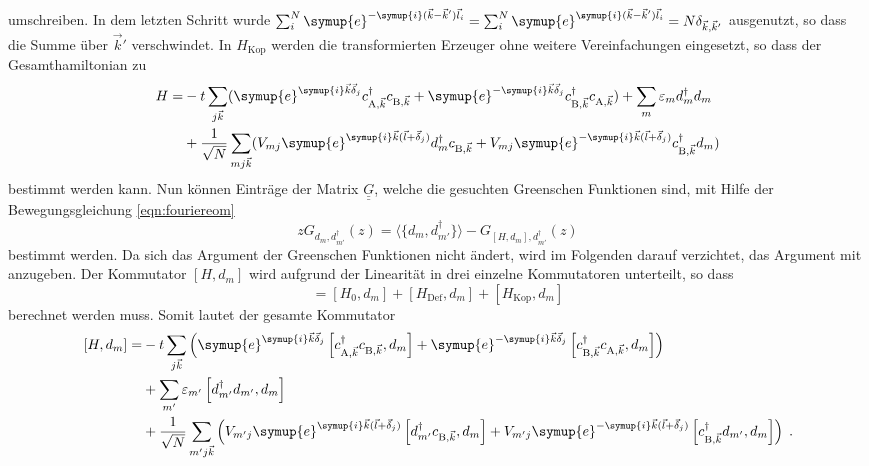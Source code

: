 umschreiben.
In dem letzten Schritt wurde $\sum_{i}^N \symup{e}^{-\symup{i}(\vec{k}- \vec{k}')\vec{l}_i} 
= \sum_{i}^N \symup{e}^{\symup{i}(\vec{k}- \vec{k}')\vec{l}_i} = N\delta_{\vec{k}, \vec{k}'}$ ausgenutzt, so dass die Summe über $\vec{k}'$ verschwindet.
In $H_\text{Kop}$ werden die transformierten Erzeuger ohne weitere Vereinfachungen eingesetzt,  so dass der Gesamthamiltonian zu 
\begin{equation*}
    \begin{split}
        H = &-t \sum_{j \vec{k}} ( \symup{e}^{\symup{i}\vec{k}\vec{\delta}_j}c^\dagger_{\text{A},\vec{k}} c_{\text{B},\vec{k}} + 
            \symup{e}^{-\symup{i}\vec{k}\vec{\delta}_j} c^\dagger_{\text{B},\vec{k}}c_{\text{A},\vec{k}}) + \sum_m \varepsilon_m d_m^\dagger d_m \\
            &+ \frac{1}{\sqrt{N}}\sum_{mj\vec{k}} ( V_{mj}  \symup{e}^{\symup{i}\vec{k}(\vec{l}+\vec{\delta}_j)} d_m^\dagger c_{\text{B},\vec{k}} 
            + V_{mj} \symup{e}^{-\symup{i}\vec{k}(\vec{l}+\vec{\delta}_j)}c^\dagger_{\text{B},\vec{k}} d_m )
    \end{split}
\end{equation*}
bestimmt werden kann.
Nun können Einträge der Matrix $\underline{\underline{G}}$, welche die gesuchten Greenschen Funktionen sind, mit Hilfe der Bewegungsgleichung \eqref{eqn:fouriereom} 
\begin{equation}
    zG_{d_m, d_{m'}^\dagger}(z) = \langle \{ d_m, d_{m'}^\dagger \} \rangle - G_{[H,d_m], d_{m'}^\dagger} (z) \label{eqn:eomgreenansatz}
\end{equation}
bestimmt werden.
Da sich das Argument der Greenschen Funktionen nicht ändert, wird im Folgenden darauf verzichtet, das Argument mit anzugeben.
Der Kommutator $[H,d_m]$ wird aufgrund der Linearität in drei einzelne Kommutatoren unterteilt, so dass
\begin{equation*}
    [H,d_m] = [H_0,d_m] + [H_\text{Def},d_m] +[H_\text{Kop},d_m] 
\end{equation*}
berechnet werden muss.
Somit lautet der gesamte Kommutator
\begin{equation}
    \begin{split}
    [H, d_m] = &-t \sum_{j\vec{k}} \left ( \symup{e}^{\symup{i}\vec{k} \vec{\delta}_j}      \left [ c^\dagger_{\text{A},\vec{k}}  
        c_{\text{B},\vec{k}}, d_m \right ] + \symup{e}^{-\symup{i}\vec{k} \vec{\delta}_j}   \left [ c^\dagger_{\text{B},\vec{k}}  
        c_{\text{A},\vec{k}}, d_m \right ]  \right ) \\
        &+\sum_{m'} \varepsilon_{m'} \left [ d^\dagger_{m'} d_{m'}, d_{m} \right ] \\
        &+ \frac{1}{\sqrt{N}} \sum_{m'j\vec{k}} \left ( V_{m'j} \symup{e}^{\symup{i}\vec{k} (\vec{l} + \vec{\delta}_j)}   
        \left [d^\dagger_{m'}c_{\text{B}, \vec{k}}, d_m \right ]
        +  V_{m'j} \symup{e}^{-\symup{i}\vec{k} (\vec{l} + \vec{\delta}_j)}   
        \left [c^\dagger_{\text{B},\vec{k}} d_{m'},  d_m \right ]
        \right ) \; . \label{eqn:commutator_H_dm}
    \end{split}
\end{equation} 
